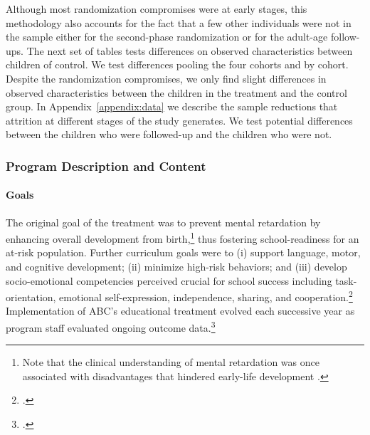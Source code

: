 \begin{appendices}
\noindent Although most randomization compromises were at early stages, this methodology also accounts for the fact that a few other individuals were not in the sample either for the second-phase randomization or for the adult-age follow-ups. The next set of tables tests differences on observed characteristics between children of control. We test differences pooling the four cohorts and by cohort. Despite the randomization compromises, we only find slight differences in observed characteristics between the children in the treatment and the control group. In Appendix~\ref{appendix:data} we describe the sample reductions that attrition at different stages of the study generates. We test potential differences between the children who were followed-up and the children who were not.\\

\subsubsection{Program Description and Content}

\paragraph{Goals}
\noindent The original goal of the treatment was to prevent mental retardation by enhancing overall development from birth,\footnote{Note that the clinical understanding of mental retardation was once associated with disadvantages that hindered early-life development \citep{Mental-Retardation_America_2004_BOOK_NYU}.} thus fostering school-readiness for an at-risk population. Further curriculum goals were to (i) support language, motor, and cognitive development; (ii) minimize high-risk behaviors; and (iii) develop socio-emotional competencies perceived crucial for school success including task-orientation, emotional self-expression, independence, sharing, and cooperation.\footnote{\citet{Sparling_1974_Synth_Edu_Infant_SPEECH,Ramey_Collier_etal_1976_CarolinaAbecedarianProject,Ramey-etal_2012-ABC}.} Implementation of ABC's educational treatment evolved each successive year as program staff evaluated ongoing outcome data.\footnote{ \citet{McGinness_1982_Language-Poverty-Child,Haskins_1985_CD,Finkelstein_1982_Day_Care_YC,Ramey-etal_1975_AJoMD}.}\\



\end{appendices}
